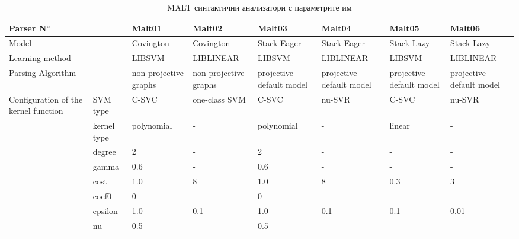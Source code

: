\begin{table}[!htb] 
  \begin{tabular}{|l|l|l|l|l|l|l|l|}
\hline 
\hline 
Parser N° &	 &	Malt01 &	Malt02 &	Malt03 &	Malt04 &	Malt05 &	Malt06\\ 
\hline 
Model &	 &	Covington &	Covington &	Stack Eager &	Stack Eager &	Stack Lazy &	Stack Lazy\\ 
\hline 
Learning method &	 &	LIBSVM &	LIBLINEAR &	LIBSVM &	LIBLINEAR &	LIBSVM &	LIBLINEAR\\ 
\hline 
Parsing Algorithm &	 &	non-projective graphs &	non-projective graphs &	projective default model &	projective default model &	projective default model &	projective default model\\ 
\hline 
Configuration of the kernel function &	SVM type &	C-SVC &	one-class SVM &	C-SVC &	nu-SVR &	C-SVC &	nu-SVR\\ 
\hline 
 &	kernel type &	polynomial &	- &	polynomial &	- &	linear &	-\\ 
\hline 
 &	degree &	2 &	- &	2 &	- &	- &	-\\ 
\hline 
 &	gamma &	0.6 &	- &	0.6 &	- &	- &	-\\ 
\hline 
 &	cost &	1.0 &	8 &	1.0 &	8 &	0.3 &	3\\ 
\hline 
 &	coef0 &	0 &	- &	0 &	- &	- &	-\\ 
\hline 
 &	epsilon &	1.0 &	0.1 &	1.0 &	0.1 &	0.1 &	0.01\\ 
\hline 
 &	nu &	0.5 &	- &	0.5 &	- &	- &	-\\ 
\hline 
 \end{tabular}
 \label{tab:malts}
\caption{MALT синтактични анализатори с параметрите им}
 \end{table}